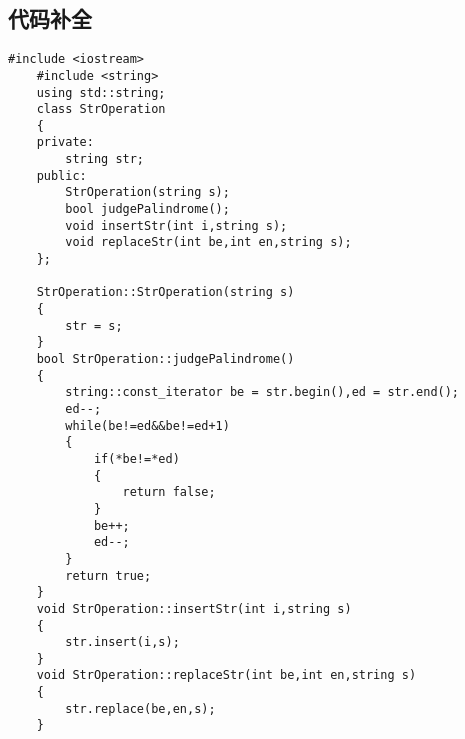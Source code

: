 \documentclass[UTF8]{ctexart}
\begin{document}
\subsection{代码补全}
\begin{lstlisting}[language={[ANSI]C++}]
    #include <iostream>
    #include <string>
    using std::string;
    class StrOperation
    {
    private:
        string str;
    public:
        StrOperation(string s);
        bool judgePalindrome();
        void insertStr(int i,string s);
        void replaceStr(int be,int en,string s);
    };
    
    StrOperation::StrOperation(string s)
    {
        str = s;
    }
    bool StrOperation::judgePalindrome()
    {
        string::const_iterator be = str.begin(),ed = str.end();
        ed--;
        while(be!=ed&&be!=ed+1)
        {
            if(*be!=*ed)
            {
                return false;
            }
            be++;
            ed--;
        }
        return true;
    }
    void StrOperation::insertStr(int i,string s)
    {
        str.insert(i,s);
    }
    void StrOperation::replaceStr(int be,int en,string s)
    {
        str.replace(be,en,s);
    }
    
\end{lstlisting}
\end{document}

